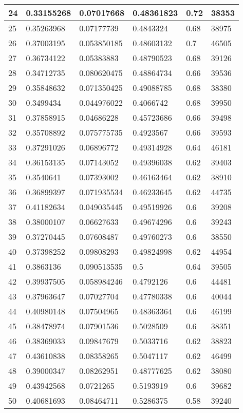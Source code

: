\begin{longtable}{|l|l|l|l|l|l|}
24 & 0.33155268 & 0.07017668 & 0.48361823 & 0.72 & 38353 \\ \hline 
25 & 0.35263968 & 0.07177739 & 0.4843324 & 0.68 & 38975 \\ \hline 
26 & 0.37003195 & 0.053850185 & 0.48603132 & 0.7 & 46505 \\ \hline 
27 & 0.36734122 & 0.05383883 & 0.48790523 & 0.68 & 39126 \\ \hline 
28 & 0.34712735 & 0.080620475 & 0.48864734 & 0.66 & 39536 \\ \hline 
29 & 0.35848632 & 0.071350425 & 0.49088785 & 0.68 & 38380 \\ \hline 
30 & 0.3499434 & 0.044976022 & 0.4066742 & 0.68 & 39950 \\ \hline 
31 & 0.37858915 & 0.04686228 & 0.45723686 & 0.66 & 39498 \\ \hline 
32 & 0.35708892 & 0.075775735 & 0.4923567 & 0.66 & 39593 \\ \hline 
33 & 0.37291026 & 0.06896772 & 0.49314928 & 0.64 & 46181 \\ \hline 
34 & 0.36153135 & 0.07143052 & 0.49396038 & 0.62 & 39403 \\ \hline 
35 & 0.3540641 & 0.07393002 & 0.46163464 & 0.62 & 38910 \\ \hline 
36 & 0.36899397 & 0.071935534 & 0.46233645 & 0.62 & 44735 \\ \hline 
37 & 0.41182634 & 0.049035445 & 0.49519926 & 0.6 & 39208 \\ \hline 
38 & 0.38000107 & 0.06627633 & 0.49674296 & 0.6 & 39243 \\ \hline 
39 & 0.37270445 & 0.07608487 & 0.49760273 & 0.6 & 38550 \\ \hline 
40 & 0.37398252 & 0.09808293 & 0.49824998 & 0.62 & 44954 \\ \hline 
41 & 0.3863136 & 0.090513535 & 0.5 & 0.64 & 39505 \\ \hline 
42 & 0.39937505 & 0.058984246 & 0.4792126 & 0.6 & 44481 \\ \hline 
43 & 0.37963647 & 0.07027704 & 0.47780338 & 0.6 & 40044 \\ \hline 
44 & 0.40980148 & 0.07504965 & 0.48363364 & 0.6 & 46199 \\ \hline 
45 & 0.38478974 & 0.07901536 & 0.5028509 & 0.6 & 38351 \\ \hline 
46 & 0.38369033 & 0.09847679 & 0.5033716 & 0.62 & 38823 \\ \hline 
47 & 0.43610838 & 0.08358265 & 0.5047117 & 0.62 & 46499 \\ \hline 
48 & 0.39000347 & 0.08262951 & 0.48777625 & 0.62 & 38080 \\ \hline 
49 & 0.43942568 & 0.0721265 & 0.5193919 & 0.6 & 39682 \\ \hline 
50 & 0.40681693 & 0.08464711 & 0.5286375 & 0.58 & 39240 \\ \hline 
\end{longtable}